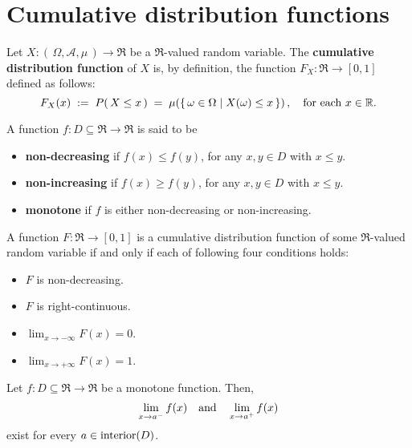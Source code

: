 

\section{Cumulative distribution functions}
\setcounter{theorem}{0}
\setcounter{equation}{0}

\begin{definition}\quad
Let $X : \left(\,\Omega,\mathcal{A},\mu\,\right) \longrightarrow \Re$ be a $\Re$-valued random variable.
The \textbf{cumulative distribution function} of $X$ is, by definition, the function
$F_{X} : \Re \longrightarrow [0,1]$ defined as follows:
\begin{equation*}
F_{X}(x) \; := \; P\!\left(\,X \leq x\,\right) \; = \; \mu\!\left(\left\{\,\omega \in \Omega \;\vert\; X(\omega) \leq x \,\right\}\right),
\quad
\textnormal{for each $x \in \Re$}.
\end{equation*}
\end{definition}

\begin{definition}\quad
A function $f : D \subseteq \Re \longrightarrow \Re$ is said to be 
\begin{itemize}
\item	\textbf{non-decreasing} if $f(x) \leq f(y)$, for any $x, y \in D$ with $x \leq y$.
\item	\textbf{non-increasing} if $f(x) \geq f(y)$, for any $x, y \in D$ with $x \leq y$.
\item	\textbf{monotone} if $f$ is either non-decreasing or non-increasing.
\end{itemize}
\end{definition}

\begin{theorem}\quad
A function $F : \Re \longrightarrow [0,1]$ is a cumulative distribution function of some
$\Re$-valued random variable if and only if each of following four conditions holds:
\begin{itemize}
\item	$F$ is non-decreasing.
\item	$F$ is right-continuous.
\item	$\lim_{x\rightarrow-\infty}F(x) = 0$.
\item	$\lim_{x\rightarrow+\infty}F(x) = 1$.
\end{itemize}
\end{theorem}

\begin{theorem}\quad
Let $f : D \subseteq \Re \longrightarrow \Re$ be a monotone function.
Then,
\begin{equation*}
\lim_{x \rightarrow a^{-}} f(x)
\quad\textnormal{and}\quad
\lim_{x \rightarrow a^{+}} f(x)
\end{equation*}
exist for every $a \in \textnormal{interior}(D)$.
\end{theorem}

